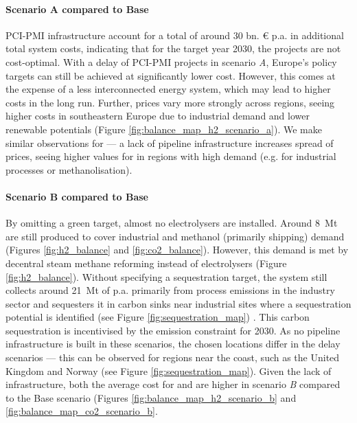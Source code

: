 \documentclass[final,5p,times,twocolumn]{elsarticle}
\let\autocite\cite
\begin{document}
\paragraph{Scenario A compared to Base} PCI-PMI infrastructure account for a total of around 30 bn. \euro{} p.a. in additional total system costs, indicating that for the target year 2030, the projects are not cost-optimal. With a delay of PCI-PMI projects in scenario \textit{A}, Europe's policy targets can still be achieved at significantly lower cost. However, this comes at the expense of a less interconnected energy system, which may lead to higher costs in the long run. Further,  prices vary more strongly across regions, seeing higher costs in southeastern Europe due to industrial demand and lower renewable potentials (Figure \ref{fig:balance_map_h2_scenario_a}). We make similar observations for  --- a lack of pipeline infrastructure increases spread of  prices, seeing higher values for  in regions with high demand (e.g. for industrial processes or methanolisation). 

\paragraph{Scenario B compared to Base}
By omitting a green  target, almost no electrolysers are installed. Around \SI{8}{Mt} are still produced to cover industrial  and methanol (primarily shipping) demand (Figures \ref{fig:h2_balance} and \ref{fig:co2_balance}). However, this demand is met by decentral steam methane reforming instead of electrolysers (Figure \ref{fig:h2_balance}). 
Without specifying a  sequestration target, the system still collects around \SI{21}{Mt} of  p.a. primarily from process emissions in the industry sector and sequesters it in carbon sinks near industrial sites where a sequestration potential is identified (see Figure \ref{fig:sequestration_map}) \autocite{hofmannH2CO2Network2024}. This carbon sequestration is incentivised by the emission constraint for 2030. As no pipeline infrastructure is built in these scenarios, the chosen locations differ in the delay scenarios --- this can be observed for regions near the coast, such as the United Kingdom and Norway (see Figure \ref{fig:sequestration_map}). Given the lack of infrastructure, both the average cost for  and  are higher in scenario \textit{B} compared to the Base scenario (Figures \ref{fig:balance_map_h2_scenario_b} and \ref{fig:balance_map_co2_scenario_b}.
\end{document}
